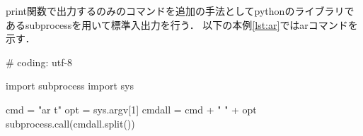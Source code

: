 \vspace{3mm}
print関数で出力するのみのコマンドを追加の手法としてpythonのライブラリであるsubprocessを用いて標準入出力を行う．
以下の本例\ref{lst:ar}ではarコマンドを示す．
\vspace{3mm}
\begin{mylisting}[label={lst:ar},language=sh,caption=ar]
# coding: utf-8

import subprocess
import sys

cmd = "ar t"
opt = sys.argv[1]
cmdall = cmd + " " + opt
subprocess.call(cmdall.split())

\end{mylisting}
\vspace{3mm}



